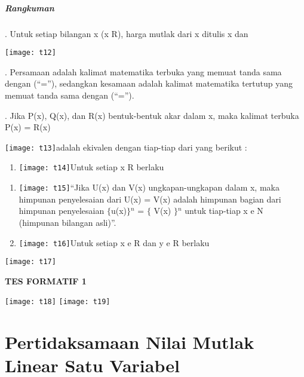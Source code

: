 \documentclass[11pt,fleqn]{book} %
\begin{document}
\noindent 
\subparagraph{Rangkuman}

\noindent 

. Untuk setiap bilangan x (x R), harga mutlak dari x ditulis x dan

\noindent \texttt{[image: t12]}

. Persamaan adalah kalimat matematika terbuka yang memuat tanda sama dengan (``=''), sedangkan kesamaan adalah kalimat matematika tertutup yang memuat tanda sama dengan (``='').

. Jika P(x), Q(x), dan R(x) bentuk-bentuk akar dalam x, maka kalimat terbuka P(x) = R(x)

\noindent 

\noindent \texttt{[image: t13]}adalah ekivalen dengan tiap-tiap dari yang berikut :

\noindent 

\begin{enumerate}
\item  \texttt{[image: t14]}Untuk setiap x   R berlaku
\end{enumerate}

\noindent 

\begin{enumerate}
\item  \texttt{[image: t15]}``Jika U(x) dan V(x) ungkapan-ungkapan dalam x, maka himpunan penyelesaian dari U(x) = V(x) adalah himpunan bagian dari himpunan penyelesaian $\{$u(x)$\}$${}^{n}$ = $\{$ V(x) $\}$${}^{n}$ untuk tiap-tiap x e N (himpunan bilangan asli)''.

\item  \texttt{[image: t16]}Untuk setiap x e R dan y e  R berlaku
\end{enumerate}
\noindent 
\texttt{[image: t17]} 

\noindent \textbf{TES FORMATIF 1}
\textbf{ }

\noindent
\texttt{[image: t18]}
\noindent
\texttt{[image: t19]}


\section{Pertidaksamaan Nilai Mutlak Linear Satu Variabel}
\end{document}
